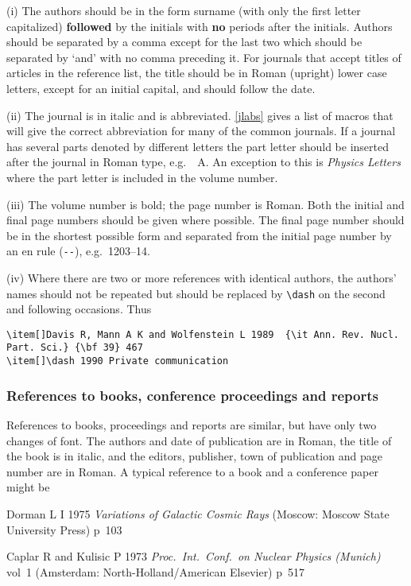 (i) The authors should be in the form surname (with only the first
letter capitalized) {\bf followed} by the initials with {\bf no}
periods after the initials. Authors should be separated by a comma
except for the last two which should be separated by `and' with no
comma preceding it. For journals that accept titles of articles in the
reference list,  the title should be in Roman (upright)
lower case letters, except for an initial
capital, and should follow the date.

(ii) The journal is in italic and is abbreviated. \ref{jlabs}
gives a list of
macros that will give the correct abbreviation for
many of the common journals. If a journal has several parts denoted by
different letters the part letter
should be inserted after the journal in Roman type, e.g.\
{\PR\ \rm A}. An exception to this is {\it Physics Letters} where
the part letter is included in the volume number.

(iii) The volume number is bold; the page number is Roman.
 Both the initial and final page
numbers should be given where possible. The final page number should be in
the shortest possible form and separated from the initial page number by an
en rule (\verb"--"), e.g.\ 1203--14.

(iv) Where there are two or more references with identical authors,
the authors' names should not be repeated but should be replaced by
\verb"\dash" on the second and following occasions. Thus
\begin{verbatim}
\item[]Davis R, Mann A K and Wolfenstein L 1989  {\it Ann. Rev. Nucl.
Part. Sci.} {\bf 39} 467
\item[]\dash 1990 Private communication
\end{verbatim}



\subsubsection{References to books, conference proceedings and reports}
References to books, proceedings and reports are similar, but have only two
changes of font. The authors and date of publication are in Roman, the
title of the book is in italic, and the editors, publisher,
town of publication
and page number are in Roman. A typical reference to a book and a
conference paper might be

\smallskip
\begin{harvard}
\item[] Dorman L I 1975 {\it Variations of Galactic Cosmic Rays}
(Moscow: Moscow State University Press) p~103
\item[] Caplar R and Kulisic P 1973 {\it Proc.\
Int.\ Conf.\ on Nuclear Physics (Munich)} vol~1 (Amsterdam:
North-Holland/American Elsevier) p~517
\end{harvard}
\smallskip

